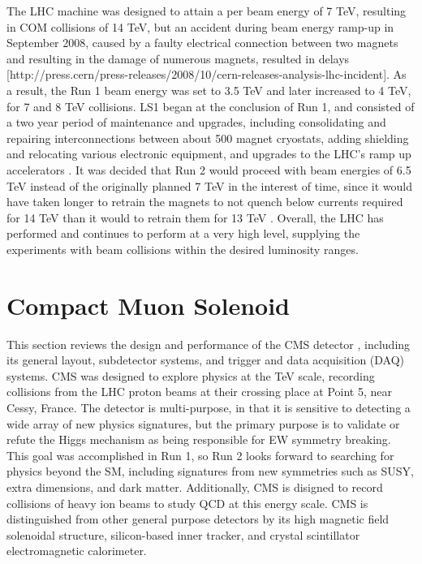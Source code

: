 \indent The LHC machine was designed to attain a per beam energy of 7 TeV, resulting in COM collisions of 14 TeV, but an accident during beam energy ramp-up in September 2008, caused by a faulty electrical connection between two magnets and resulting in the damage of numerous magnets, resulted in delays [http://press.cern/press-releases/2008/10/cern-releases-analysis-lhc-incident]. As a result, the Run 1 beam energy was set to 3.5 TeV and later increased to 4 TeV, for 7 and 8 TeV collisions. LS1 began at the conclusion of Run 1, and consisted of a two year period of maintenance and upgrades, including consolidating and repairing interconnections between about 500 magnet cryostats, adding shielding and relocating various electronic equipment, and upgrades to the LHC's ramp up accelerators \cite{CMS:CERN1}. It was decided that Run 2 would proceed with beam energies of 6.5 TeV instead of the originally planned 7 TeV in the interest of time, since it would have taken longer to retrain the magnets to not quench below currents required for 14 TeV than it would to retrain them for 13 TeV \cite{CMS:CERN2}. Overall, the LHC has performed and continues to perform at a very high level, supplying the experiments with beam collisions within the desired luminosity ranges. 

\section{Compact Muon Solenoid}

This section reviews the design and performance of the CMS detector \cite{1748-0221-3-08-S08004}, including its general layout, subdetector systems, and trigger and data acquisition (DAQ) systems. CMS was designed to explore physics at the TeV scale, recording collisions from the LHC proton beams at their crossing place at Point 5, near Cessy, France. The detector is multi-purpose, in that it is sensitive to detecting a wide array of new physics signatures, but the primary purpose is to validate or refute the Higgs mechanism as being responsible for EW symmetry breaking. This goal was accomplished in Run 1, so Run 2 looks forward to searching for physics beyond the SM, including signatures from new symmetries such as SUSY, extra dimensions, and dark matter. Additionally, CMS is disigned to record collisions of heavy ion beams to study QCD at this energy scale. CMS is distinguished from other general purpose detectors by its high magnetic field solenoidal structure, silicon-based inner tracker, and crystal scintillator electromagnetic calorimeter. 

